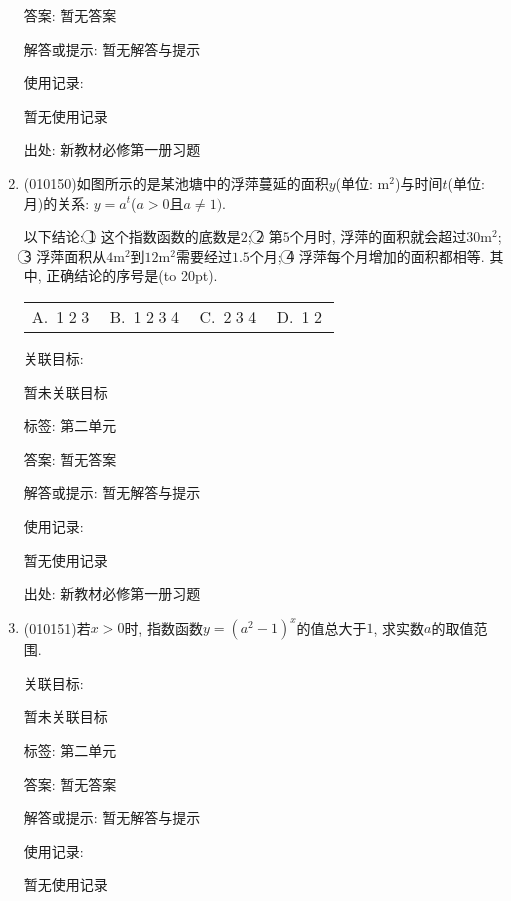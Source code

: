 \documentclass[10pt,a4paper]{article}
\newcommand{\bracket}[1]{(\hbox to #1pt{})}
\newcommand{\fourch}[4]{\par\begin{tabular}{p{.23\textwidth}p{.23\textwidth}p{.23\textwidth}p{.23\textwidth}}
A.~#1 &B.~#2& C.~#3& D.~#4
\end{tabular}}
\begin{document}
\begin{enumerate}[1.]
答案: 暂无答案

解答或提示: 暂无解答与提示

使用记录:

暂无使用记录


出处: 新教材必修第一册习题
\item { (010150)}如图所示的是某池塘中的浮萍蔓延的面积$y$(单位: $\text{m}^2$)与时间$t$(单位: 月)的关系: $y=a^t$($a>0$且$a\ne 1)$. 
\begin{center}
\end{center}
以下结论:
\textcircled{1} 这个指数函数的底数是$2$; 
\textcircled{2} 第$5$个月时, 浮萍的面积就会超过$30\text{m}^2$;
\textcircled{3} 浮萍面积从$4\text{m}^2$到$12\text{m}^2$需要经过$1.5$个月;
\textcircled{4} 浮萍每个月增加的面积都相等. 其中, 正确结论的序号是\bracket{20}.
\fourch{\textcircled{1}\textcircled{2}\textcircled{3}}{\textcircled{1}\textcircled{2}\textcircled{3}\textcircled{4}}{\textcircled{2}\textcircled{3}\textcircled{4}}{\textcircled{1}\textcircled{2}}


关联目标:

暂未关联目标



标签: 第二单元

答案: 暂无答案

解答或提示: 暂无解答与提示

使用记录:

暂无使用记录


出处: 新教材必修第一册习题
\item { (010151)}若$x>0$时, 指数函数$y=(a^2-1)^x$的值总大于$1$, 求实数$a$的取值范围.


关联目标:

暂未关联目标



标签: 第二单元

答案: 暂无答案

解答或提示: 暂无解答与提示

使用记录:

暂无使用记录



\end{enumerate}
\end{document}
